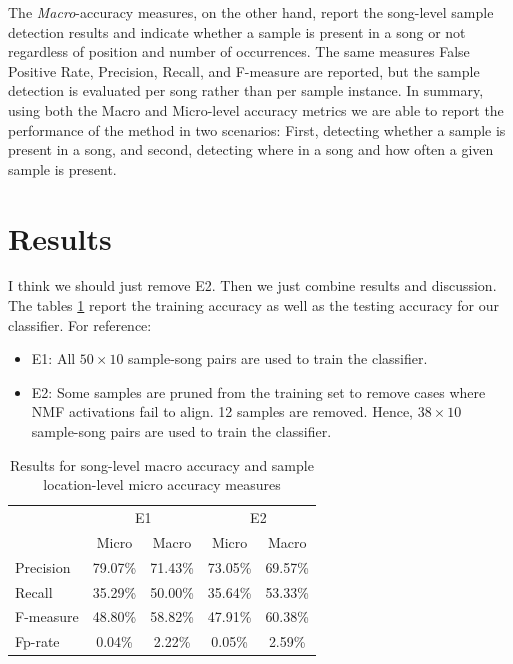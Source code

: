 \documentclass{article}
\begin{document}
The \textit{Macro}-accuracy measures, on the other hand, report the song-level sample detection results and indicate whether a sample is present in a song or not regardless of position and number of occurrences. The same measures False Positive Rate, Precision, Recall, and F-measure are reported, but the sample detection is evaluated per song rather than per sample instance.
In summary, using both the Macro and Micro-level accuracy metrics we are able to report the performance of the method in two scenarios: First, detecting whether a sample is present in a song, and second, detecting where in a song and how often a given sample is present.

\section{Results}
{\color{red} I think we should just remove E2. Then we just combine results and discussion.}
The tables \ref{results} report the training accuracy as well as the testing accuracy for our classifier. For reference:
\begin{itemize}
\item E1: All $50 \times 10$ sample-song pairs are used to train the classifier.
\item E2: Some samples are pruned from the training set to remove cases where NMF activations fail to align. 12 samples are removed. Hence, $38 \times 10$ sample-song pairs are used to train the classifier.
\end{itemize}

\begin{table}[t]
\centering
\begin{tabular}{l|c|c|c|c|}
\cline{2-5}
                                & \multicolumn{2}{c|}{E1} & \multicolumn{2}{c|}{E2} \\ \cline{2-5} 
                                & Micro      & Macro      & Micro      & Macro      \\ \hline
\multicolumn{1}{|l|}{Precision} & 79.07\%    & 71.43\%    & 73.05\%    & 69.57\%    \\ \hline
\multicolumn{1}{|l|}{Recall}    & 35.29\%    & 50.00\%    & 35.64\%    & 53.33\%    \\ \hline
\multicolumn{1}{|l|}{F-measure} & 48.80\%    & 58.82\%    & 47.91\%    & 60.38\%    \\ \hline
\multicolumn{1}{|l|}{Fp-rate}   & 0.04\%     & 2.22\%     & 0.05\%     & 2.59\%     \\ \hline
\end{tabular}
\caption{Results for song-level macro accuracy and sample location-level micro accuracy measures}
\label{results}
\end{table}
\end{document}
